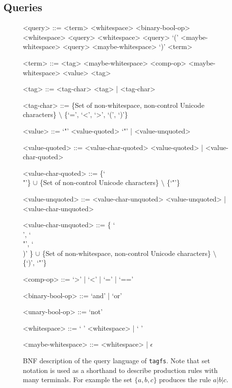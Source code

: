 
\subsection{Queries}
\label{sec:queries}

\begin{figure}[t]
\begin{grammar}
<query> ::= <term> <whitespace> <binary-bool-op> <whitespace> <query>
     <whitespace> <query>
    \alt `(' <maybe-whitespace> <query> <maybe-whitespace> `)'
    \alt <term>

<term> ::= <tag> <maybe-whitespace> <comp-op> <maybe-whitespace> <value>
    \alt <tag>

<tag> ::= <tag-char> <tag> | <tag-char>

<tag-char> ::= \{Set of non-whitespace, non-control Unicode characters\}
    $\setminus$ \{`=', `<', `>', `(', `)'\}

<value> ::= `"' <value-quoted> `"' | <value-unquoted>

<value-quoted> ::= <value-char-quoted> <value-quoted>
    | <value-char-quoted>

    <value-char-quoted> ::= \{`\\"'\} $\cup$ \{Set of non-control Unicode
        characters\} $\setminus$ \{`"'\}

<value-unquoted> ::= <value-char-unquoted> <value-unquoted>
    | <value-char-unquoted>

<value-char-unquoted> ::= \{ `\\ ', `\\"', `\\)' \} $\cup$ \{Set of
    non-whitespace, non-control Unicode characters\} $\setminus$ \{`)', `"'\}

<comp-op> ::= `>' | `<' | `=' | `=='

<binary-bool-op> ::= `and' | `or'

<unary-bool-op> ::= `not'

<whitespace> ::= ` ' <whitespace> | ` '

<maybe-whitespace> ::= <whitespace> | $\epsilon$

\end{grammar}
\label{fig:query-bnf}
\caption[BNF description of the query language of \texttt{tagfs}]
    {BNF description of the query language of \texttt{tagfs}. Note that set
    notation is used as a shorthand to describe production rules with many
    terminals. For example the set $\{a, b, c\}$ produces the rule $a \vert b
    \vert c$. }
\end{figure}

